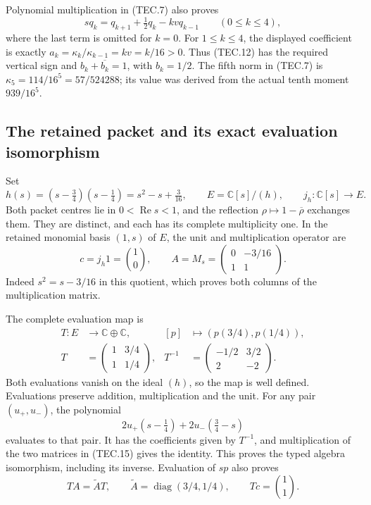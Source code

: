 Polynomial multiplication in (TEC.7) also proves
\[
 s q_k=q_{k+1}+\tfrac12q_k-kv q_{k-1}
       \qquad(0\leq k\leq4),                                   \tag{TEC.12}
\]
where the last term is omitted for \(k=0\).  For \(1\leq k\leq4\),
the displayed coefficient is exactly
\(a_k=\kappa_k/\kappa_{k-1}=kv=k/16>0\).
Thus (TEC.12) has the required vertical sign and
\(b_k+\overline{b_k}=1\), with \(b_k=1/2\).
The fifth norm in (TEC.7) is
\(\kappa_5=114/16^5=57/524288\); its value was derived from the
actual tenth moment \(939/16^5\).

\subsection{The retained packet and its exact evaluation isomorphism}

Set
\[
 h(s)=(s-\tfrac34)(s-\tfrac14)=s^2-s+\tfrac3{16},\qquad
 E=\mathbb C[s]/(h),\qquad j_h:\mathbb C[s]\longrightarrow E.
                                                                    \tag{TEC.13}
\]
Both packet centres lie in \(0<\operatorname{Re}s<1\), and the
reflection \(\rho\mapsto1-\overline\rho\) exchanges them.  They are
distinct, and each has its complete multiplicity one.  In the retained
monomial basis \((1,s)\) of \(E\), the unit and multiplication operator
are
\[
 c=j_h1=\binom10,\qquad
 A=M_s=\begin{pmatrix}0&-3/16\\1&1\end{pmatrix}.                 \tag{TEC.14}
\]
Indeed \(s^2=s-3/16\) in this quotient, which proves both columns
of the multiplication matrix.

The complete evaluation map is
\[
\begin{aligned}
 T:E&\longrightarrow\mathbb C\oplus\mathbb C,&
 [p]&\longmapsto(p(3/4),p(1/4)),\\
 T&=\begin{pmatrix}1&3/4\\1&1/4\end{pmatrix},&
 T^{-1}&=\begin{pmatrix}-1/2&3/2\\2&-2\end{pmatrix}.
\end{aligned}                                                     \tag{TEC.15}
\]
Both evaluations vanish on the ideal \((h)\), so the map is well
defined.  Evaluations preserve addition, multiplication and the unit.
For any pair \((u_+,u_-)\), the polynomial
\[
 2u_+(s-\tfrac14)+2u_-(\tfrac34-s)                               \tag{TEC.16}
\]
evaluates to that pair.  It has the coefficients given by
\(T^{-1}\), and multiplication of the two matrices in (TEC.15)
gives the identity.  This proves the typed algebra isomorphism,
including its inverse.  Evaluation of \(s p\) also proves
\[
 TA=\widetilde A T,\qquad
 \widetilde A=\operatorname{diag}(3/4,1/4),\qquad
 Tc=\binom11.                                                    \tag{TEC.17}
\]

